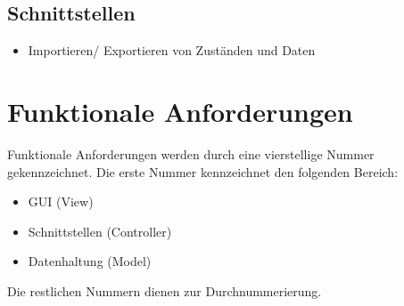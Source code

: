 \documentclass[10pt,a4paper]{article}
\begin{document}
\subsection{Schnittstellen}
\begin{itemize}
\item Importieren/ Exportieren von Zuständen und Daten
\end{itemize}


\section{Funktionale Anforderungen}
Funktionale Anforderungen werden durch eine vierstellige Nummer gekennzeichnet. Die erste Nummer kennzeichnet den folgenden Bereich:
\begin{itemize}
	\item GUI (View)
	\item Schnittstellen (Controller)
	\item Datenhaltung (Model)
\end{itemize}
Die restlichen Nummern dienen zur Durchnummerierung.
\end{document}
